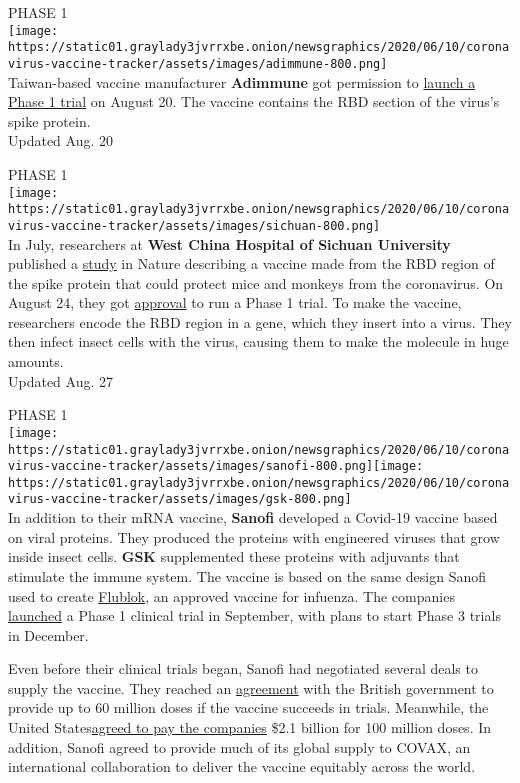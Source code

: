PHASE 1\\
\texttt{[image: https://static01.graylady3jvrrxbe.onion/newsgraphics/2020/06/10/coronavirus-vaccine-tracker/assets/images/adimmune-800.png]}\\
Taiwan-based vaccine manufacturer \textbf{Adimmune} got permission to
\href{https://focustaiwan.tw/sci-tech/202008200011}{launch a Phase 1
trial} on August 20. The vaccine contains the RBD section of the virus's
spike protein.\\
Updated Aug. 20

PHASE 1\\
\texttt{[image: https://static01.graylady3jvrrxbe.onion/newsgraphics/2020/06/10/coronavirus-vaccine-tracker/assets/images/sichuan-800.png]}\\
In July, researchers at \textbf{West China Hospital of Sichuan
University} published a
\href{https://www.nature.com/articles/s41586-020-2599-8}{study} in
Nature describing a vaccine made from the RBD region of the spike
protein that could protect mice and monkeys from the coronavirus. On
August 24, they got
\href{http://en.nhc.gov.cn/2020-08/26/c_81483.htm}{approval} to run a
Phase 1 trial. To make the vaccine, researchers encode the RBD region in
a gene, which they insert into a virus. They then infect insect cells
with the virus, causing them to make the molecule in huge amounts.\\
Updated Aug. 27

PHASE 1\\
\texttt{[image: https://static01.graylady3jvrrxbe.onion/newsgraphics/2020/06/10/coronavirus-vaccine-tracker/assets/images/sanofi-800.png]}\texttt{[image: https://static01.graylady3jvrrxbe.onion/newsgraphics/2020/06/10/coronavirus-vaccine-tracker/assets/images/gsk-800.png]}\\
In addition to their mRNA vaccine, \textbf{Sanofi} developed a Covid-19
vaccine based on viral proteins. They produced the proteins with
engineered viruses that grow inside insect cells. \textbf{GSK}
supplemented these proteins with adjuvants that stimulate the immune
system. The vaccine is based on the same design Sanofi used to create
\href{https://sanofiflu.com/flublok-quadrivalent-influenza-vaccine.html}{Flublok},
an approved vaccine for infuenza. The companies
\href{https://www.sanofi.com/en/media-room/press-releases/2020/2020-09-03-07-00-00}{launched}
a Phase 1 clinical trial in September, with plans to start Phase 3
trials in December.

Even before their clinical trials began, Sanofi had negotiated several
deals to supply the vaccine. They reached an
\href{https://www.sanofi.com/en/media-room/press-releases/2020/2020-07-29-07-00-00}{agreement}
with the British government to provide up to 60 million doses if the
vaccine succeeds in trials. Meanwhile, the United
States\href{https://www.nytimes3xbfgragh.onion/2020/07/31/health/covid-19-vaccine-sanofi-gsk.html}{agreed
to pay the companies} \$2.1 billion for 100 million doses. In addition,
Sanofi agreed to provide much of its global supply to COVAX, an
international collaboration to deliver the vaccine equitably across the
world.

